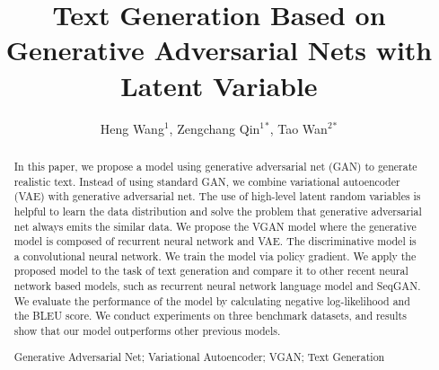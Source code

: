 \documentclass{llncs}
\newcommand{\keywords}[1]{\par\addvspace\baselineskip
\noindent\keywordname\enspace\ignorespaces#1}
\begin{document}
\mainmatter  

\title{Text Generation Based on Generative Adversarial Nets with Latent Variable}


%
%
\author{ Heng Wang$^1$, Zengchang Qin$^1$$^*$, Tao Wan$^2$$^*$}
%
%
%


\maketitle



\begin{abstract}
In this paper, we propose a model using generative adversarial net (GAN) to generate realistic text. Instead of using standard GAN, we combine variational autoencoder (VAE) with generative adversarial net. The use of high-level latent random variables is helpful to learn the data distribution and solve the problem that generative adversarial net always emits the similar data. We propose the VGAN model where the generative model is composed of recurrent neural network and VAE. The discriminative model is a convolutional neural network. We train the model via policy gradient. We apply the proposed model to the task of text generation and compare it to other recent neural network based models, such as recurrent neural network language model and SeqGAN. We evaluate the performance of the model by calculating negative log-likelihood and the BLEU score. We conduct experiments on three benchmark datasets,  and results show that our model outperforms other previous models.


\keywords{Generative  Adversarial Net;  Variational Autoencoder; VGAN; Text Generation}
\end{abstract}
\end{document}
